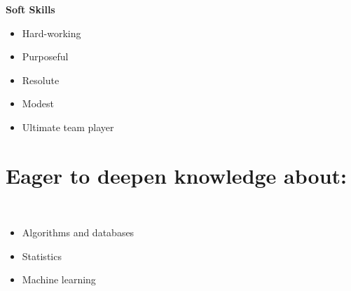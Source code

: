\documentclass[]{friggeri-cv_reccius-experiment}
\begin{document}
\begin{aside}
  	\skillspace
	\textbf{Soft Skills}\\\vspace{0.4mm}
	\begin{itemize}[leftmargin=*, noitemsep]	
	\item Hard-working
	\item Purposeful
	\item Resolute
	\item Modest
	\item Ultimate team player\\
	\end{itemize}	

  \vspace{-2.6mm}
  \section{Eager to deepen knowledge about:}\\
  	\begin{itemize}[leftmargin=*, noitemsep]
	\vspace{3mm}
	\item Algorithms and databases
	\item Statistics
	\item Machine learning
	\end{itemize}	
  
  \vspace{-2.7mm}
\end{aside}
~
\newcommand{\belowspace}{\vspace*{0.85mm}}
\end{document}
